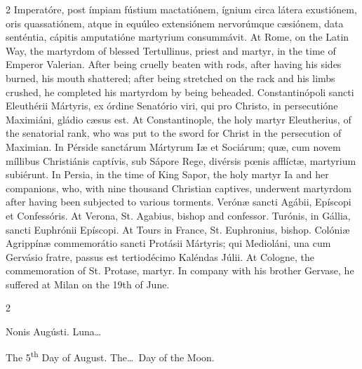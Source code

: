 \begin{paracol}{2}
 Imperatóre, post ímpiam fústium mactatiónem, ígnium circa látera exustiónem, 
 oris quassatiónem, atque in equúleo extensiónem nervorúmque cæsiónem, data 
 senténtia, cápitis amputatióne martyrium consummávit.
\switchcolumn
{}
At Rome, on the Latin Way, the 
 martyrdom of blessed Tertullinus, priest and martyr, in the time of Emperor 
 Valerian. After being cruelly beaten with rods, after having his sides 
 burned, his mouth shattered; after being stretched on the rack and his limbs 
 crushed, he completed his martyrdom by being beheaded.
\switchcolumn*
{}
Constantinópoli sancti 
 Eleuthérii Mártyris, ex órdine Senatório viri, qui pro Christo, in 
 persecutióne Maximiáni, gládio cæsus est.
\switchcolumn
{}
At Constantinople, the holy martyr 
 Eleutherius, of the senatorial rank, who was put to the sword for Christ in 
 the persecution of Maximian.
\switchcolumn*
{}
In Pérside sanctárum 
 Mártyrum Iæ et Sociárum; quæ, cum novem míllibus Christiánis captívis, sub 
 Sápore Rege, divérsis pœnis afflíctæ, martyrium subiérunt.
\switchcolumn
{}
In Persia, in the time of King Sapor, 
 the holy martyr Ia and her companions, who, with nine thousand Christian 
 captives, underwent martyrdom after having been subjected to various 
 torments.
\switchcolumn*
{}
Verónæ sancti Agábii, 
 Epíscopi et Confessóris.
\switchcolumn
{}
At Verona, St. Agabius, bishop and 
 confessor.
\switchcolumn*
{}
Turónis, in Gállia, 
 sancti Euphrónii Epíscopi.
\switchcolumn
{}
At Tours in France, St. Euphronius, bishop.
\switchcolumn*
{}
Colóniæ Agrippínæ 
 commemorátio sancti Protásii Mártyris; qui Medioláni, una cum Gervásio 
 fratre, passus est tertiodécimo Kaléndas Júlii.
\switchcolumn
{}
At Cologne, the commemoration of St. 
 Protase, martyr. In company with his brother Gervase, he suffered at 
 Milan on the 19th of June.
\switchcolumn*
{}
\end{paracol}


\begin{paracol}{2}
\begin{center}{\color{gregoriocolor} Nonis Augústi. 
 Luna\dots\ }\end{center}
\switchcolumn
{}
\begin{center}{\color{gregoriocolor} The   5\textsuperscript{th} Day of 
 August. The\dots\ Day of the Moon.}\end{center}
\end{paracol}

